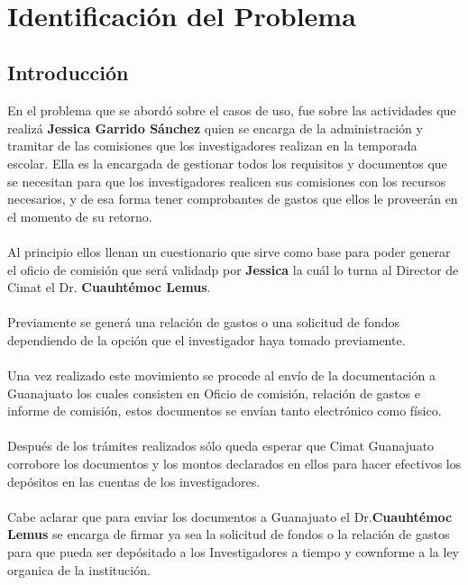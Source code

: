 \documentclass{report}
\makeatletter
\let\thedate\@date
\makeatother
\begin{document}
\begin{titlepage}
	{\large \thedate}\\[2 cm]
 
	\vfill
	
\end{titlepage}


\tableofcontents
\pagebreak

\chapter{Identificación del Problema}
    
    \section{Introducción}

En el problema que se abordó sobre el casos de uso, fue sobre las actividades que realizá \textbf{Jessica Garrido Sánchez}  quien se encarga de la administración y tramitar de las comisiones que los investigadores realizan en la temporada escolar. Ella es la encargada de gestionar todos los requisitos y documentos que se necesitan para que los investigadores realicen sus comisiones con los recursos necesarios, y de esa forma tener comprobantes de gastos que ellos le proveerán en el momento de su retorno.\\\\
Al principio ellos llenan un cuestionario que sirve como base para poder generar el oficio de comisión que será validadp por \textbf{Jessica} la cuál lo turna al Director de Cimat el Dr. \textbf{Cuauhtémoc Lemus}.\\\\
Previamente se generá una relación de gastos o una solicitud de fondos dependiendo de la opción que el investigador haya tomado previamente.\\\\
Una vez realizado este movimiento se procede al envío de la documentación a Guanajuato los cuales consisten en Oficio de comisión, relación de gastos e informe de comisión, estos documentos se envían tanto electrónico como físico.\\\\
Después de los trámites realizados sólo queda esperar que Cimat Guanajuato corrobore los documentos y los montos declarados en ellos para hacer efectivos los depósitos en las cuentas de los investigadores.\\\\
Cabe aclarar que para enviar los documentos a Guanajuato el Dr.\textbf{Cuauhtémoc Lemus} se encarga de firmar ya sea la solicitud de fondos o la relación de gastos para que pueda ser depósitado a los Investigadores a tiempo y cownforme a la ley organica de la institución. 
\end{document}

